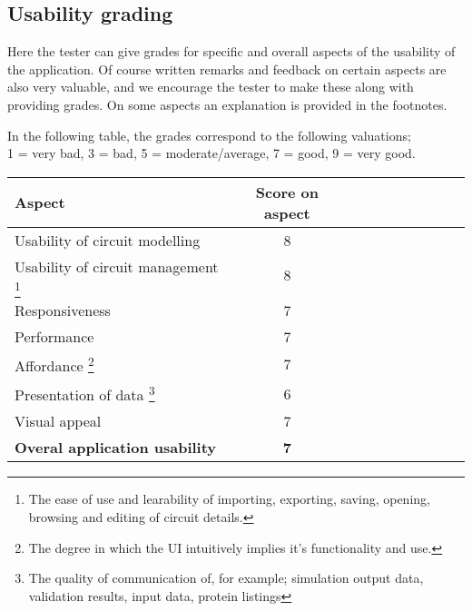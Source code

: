 \documentclass{article}
\begin{document}
\newpage
\subsection{Usability grading}
Here the tester can give grades for specific and overall aspects of the usability of the application. Of course written remarks and feedback on certain aspects are also very valuable, and we encourage the tester to make these along with providing grades. On some aspects an explanation is provided in the footnotes.

In the following table, the grades correspond to the following valuations;\\ 1 = very bad, 3 = bad, 5 = moderate/average, 7 = good, 9 = very good.
\begin{center}
\begin{tabularx}{\textwidth}{p{10cm} cc cc c cc cc} \toprule
\textbf{Aspect} & \multicolumn{1}{c}{\textbf{Score on aspect}} \\ \midrule
Usability of circuit modelling &8 \\ \midrule
Usability of circuit management \footnote{The ease of use and learability of importing, exporting, saving, opening, browsing and editing of circuit details.} &8 \\ \midrule
Responsiveness &7 \\ \midrule
Performance &7 \\ \midrule
Affordance \footnote{The degree in which the UI intuitively implies it's functionality and use.} &7 \\ \midrule
Presentation of data \footnote{The quality of communication of, for example; simulation output data, validation results, input data, protein listings} &6 \\ \midrule
Visual appeal &7 \\ \midrule
\textbf{Overal application usability} &\textbf{7} \\ \bottomrule
\end{tabularx}
\end{center}
\end{document}
